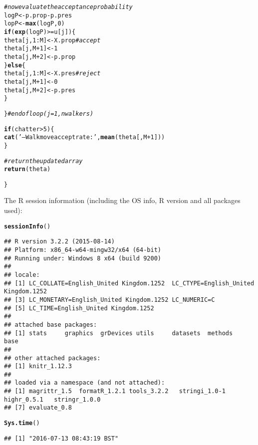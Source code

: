 \documentclass{article}\usepackage[]{graphicx}\usepackage[]{color}
\makeatletter
\newcommand{\hlnum}[1]{\textcolor[rgb]{0.686,0.059,0.569}{#1}}%
\newcommand{\hlstr}[1]{\textcolor[rgb]{0.192,0.494,0.8}{#1}}%
\newcommand{\hlcom}[1]{\textcolor[rgb]{0.678,0.584,0.686}{\textit{#1}}}%
\newcommand{\hlopt}[1]{\textcolor[rgb]{0,0,0}{#1}}%
\newcommand{\hlstd}[1]{\textcolor[rgb]{0.345,0.345,0.345}{#1}}%
\newcommand{\hlkwa}[1]{\textcolor[rgb]{0.161,0.373,0.58}{\textbf{#1}}}%
\newcommand{\hlkwb}[1]{\textcolor[rgb]{0.69,0.353,0.396}{#1}}%
\newcommand{\hlkwd}[1]{\textcolor[rgb]{0.737,0.353,0.396}{\textbf{#1}}}%
\newenvironment{kframe}{%
 \def\at@end@of@kframe{}%
 \ifinner\ifhmode%
  \def\at@end@of@kframe{\end{minipage}}%
  \begin{minipage}{\columnwidth}%
 \fi\fi%
 \def\FrameCommand##1{\hskip\@totalleftmargin \hskip-\fboxsep
 \colorbox{shadecolor}{##1}\hskip-\fboxsep
     \hskip-\linewidth \hskip-\@totalleftmargin \hskip\columnwidth}%
 \MakeFramed {\advance\hsize-\width
   \@totalleftmargin\z@ \linewidth\hsize
   \@setminipage}}%
 {\par\unskip\endMakeFramed%
 \at@end@of@kframe}
\newenvironment{knitrout}{}{} %
\makeatother
\begin{document}
\begin{knitrout}
\begin{kframe}
\begin{alltt}
    \hlcom{# now evaluate the acceptance probability}
    \hlstd{logP} \hlkwb{<-} \hlstd{p.prop} \hlopt{-} \hlstd{p.pres}
    \hlstd{lopP} \hlkwb{<-} \hlkwd{max}\hlstd{(logP,} \hlnum{0}\hlstd{)}
    \hlkwa{if} \hlstd{(} \hlkwd{exp}\hlstd{(logP)} \hlopt{>=} \hlstd{u[j] ) \{}
      \hlstd{theta[j,} \hlnum{1}\hlopt{:}\hlstd{M]} \hlkwb{<-} \hlstd{X.prop}     \hlcom{# accept}
      \hlstd{theta[j, M}\hlopt{+}\hlnum{1}\hlstd{]} \hlkwb{<-} \hlnum{1}
      \hlstd{theta[j, M}\hlopt{+}\hlnum{2}\hlstd{]} \hlkwb{<-} \hlstd{p.prop}
    \hlstd{\}} \hlkwa{else} \hlstd{\{}
      \hlstd{theta[j,} \hlnum{1}\hlopt{:}\hlstd{M]} \hlkwb{<-} \hlstd{X.pres}     \hlcom{# reject}
      \hlstd{theta[j, M}\hlopt{+}\hlnum{1}\hlstd{]} \hlkwb{<-} \hlnum{0}
      \hlstd{theta[j, M}\hlopt{+}\hlnum{2}\hlstd{]} \hlkwb{<-} \hlstd{p.pres}
    \hlstd{\}}

  \hlstd{\}} \hlcom{# end of loop (j = 1, nwalkers)}

  \hlkwa{if} \hlstd{(chatter} \hlopt{>} \hlnum{5}\hlstd{) \{}
    \hlkwd{cat}\hlstd{(}\hlstr{'-- Walk move accept rate:'}\hlstd{,} \hlkwd{mean}\hlstd{(theta[,M}\hlopt{+}\hlnum{1}\hlstd{]))}
  \hlstd{\}}

  \hlcom{# return the updated array }
  \hlkwd{return}\hlstd{(theta)}

\hlstd{\}}
\end{alltt}
\end{kframe}
\end{knitrout}

The R session information (including the OS info, R version and all
packages used):

\begin{knitrout}
\color{fgcolor}\begin{kframe}
\begin{alltt}
\hlkwd{sessionInfo}\hlstd{()}
\end{alltt}
\begin{verbatim}
## R version 3.2.2 (2015-08-14)
## Platform: x86_64-w64-mingw32/x64 (64-bit)
## Running under: Windows 8 x64 (build 9200)
## 
## locale:
## [1] LC_COLLATE=English_United Kingdom.1252  LC_CTYPE=English_United Kingdom.1252   
## [3] LC_MONETARY=English_United Kingdom.1252 LC_NUMERIC=C                           
## [5] LC_TIME=English_United Kingdom.1252    
## 
## attached base packages:
## [1] stats     graphics  grDevices utils     datasets  methods   base     
## 
## other attached packages:
## [1] knitr_1.12.3
## 
## loaded via a namespace (and not attached):
## [1] magrittr_1.5  formatR_1.2.1 tools_3.2.2   stringi_1.0-1 highr_0.5.1   stringr_1.0.0
## [7] evaluate_0.8
\end{verbatim}
\begin{alltt}
\hlkwd{Sys.time}\hlstd{()}
\end{alltt}
\begin{verbatim}
## [1] "2016-07-13 08:43:19 BST"
\end{verbatim}
\end{kframe}
\end{knitrout}
\end{document}
